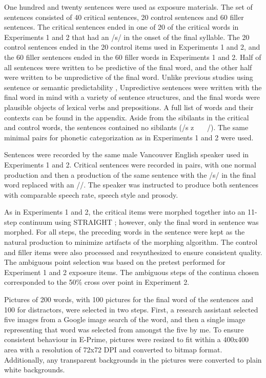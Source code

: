 One hundred and twenty sentences were used as exposure materials.  
The set of sentences consisted of 40 critical sentences, 20 control sentences and 60 filler sentences. 
The critical sentences ended in one of 20 of the critical words in Experiments 1 and 2 that had an /s/ in the onset of the final syllable.  
The 20 control sentences ended in the 20 control items used in Experiments 1 and 2, and the 60 filler sentences ended in the 60 filler words in Experiments 1 and 2.  
Half of all sentences were written to be predictive of the final word, and the other half were written to be unpredictive of the final word.  
Unlike previous studies using sentence or semantic predictability \citep{Kalikow1977}, Unpredictive sentences were written with the final word in mind with a variety of sentence structures, and the final words were plausible objects of lexical verbs and prepositions.  
A full list of words and their contexts can be found in the appendix. Aside from the sibilants in the critical and control words, the sentences contained no sibilants (/s z \textesh\ \textyogh\ \textteshlig\  \textdyoghlig/).  
The same minimal pairs for phonetic categorization as in Experiments 1 and 2 were used.

Sentences were recorded by the same male Vancouver English speaker used in Experiments 1 and 2.  
Critical sentences were recorded in pairs, with one normal production and then a production of the same sentence with the /s/ in the final word replaced with an /\textesh/.  
The speaker was instructed to produce both sentences with comparable speech rate, speech style and prosody.

As in Experiments 1 and 2, the critical items were morphed together into an 11-step continuum using STRAIGHT \citep{Kawahara2008}; however, only the final word in sentence was morphed.  
For all steps, the preceding words in the sentence were kept as the natural production to minimize artifacts of the morphing algorithm.  
The control and filler items were also processed and resynthesized to ensure consistent quality.  The ambiguous point selection was based on the pretest performed for Experiment 1 and 2 exposure items.  
The ambiguous steps of the continua chosen corresponded to the 50\% cross over point in Experiment 2.

Pictures of 200 words, with 100 pictures for the final word of the sentences and 100 for distractors, were selected in two steps.  
First, a research assistant selected five images from a Google image search of the word, and then a single image representing that word was selected from amongst the five by me.  
To ensure consistent behaviour in E-Prime, pictures were resized to fit within a 400x400 area with a resolution of 72x72 DPI and converted to bitmap format.  
Additionally, any transparent backgrounds in the pictures were converted to plain white backgrounds.

